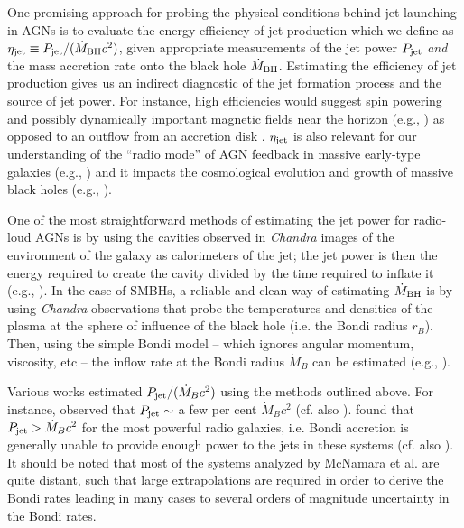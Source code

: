 \documentclass[useAMS,usenatbib]{mn2e}
\begin{document}
One promising approach for probing the physical conditions behind jet launching in AGNs is to evaluate the energy efficiency of jet production which we define as $\eta_{\rm jet} \equiv P_{\rm jet}/(\dot{M}_{\rm BH} c^2)$, given appropriate measurements of the jet power $P_{\rm jet}$ \emph{and} the mass accretion rate onto the black hole $\dot{M}_{\rm BH}$. Estimating the efficiency of jet production gives us an indirect diagnostic of the jet formation process and the source of jet power. For instance, high efficiencies would suggest spin powering and possibly dynamically important magnetic fields near the horizon (e.g., \citealt{Sasha11,Zamaninasab14}) as opposed to an outflow from an accretion disk \citep{Blandford82,Ghosh97,Livio99}. $\eta_{\rm jet}$ is also relevant for our understanding of the ``radio mode'' of AGN feedback in massive early-type galaxies (e.g., \citealt{Allen06,McNamara07,Fabian12}) and it impacts the cosmological evolution and growth of massive black holes (e.g., \citealt{Fanidakis11,Volonteri12}).

One of the most straightforward methods of estimating the jet power for radio-loud AGNs is by using the cavities observed in \emph{Chandra} images of the environment of the galaxy as calorimeters of the jet; the jet power is then the energy required to create the cavity divided by the time required to inflate it (e.g., \citealt{Dunn04,Birzan04,Dunn05,Allen06,McNamara12}). In the case of SMBHs, a reliable and clean way of estimating $\dot{M}_{\rm BH}$ is by using \emph{Chandra} observations that probe the temperatures and densities of the plasma at the sphere of influence of the black hole (i.e. the Bondi radius $r_B$). Then, using the simple Bondi model \citep{Bondi52} -- which ignores angular momentum, viscosity, etc -- the inflow rate at the Bondi radius $\dot{M}_B$ can be estimated (e.g., \citealt{Di-Matteo03}). 

Various works estimated $P_{\rm jet}/(\dot{M}_B c^2)$ using the methods outlined above. For instance, \cite{Allen06} observed that $P_{\rm jet} \sim$ a few per cent $\dot{M}_B c^2$ (cf. also \citealt{Merloni07,Balmaverde08,Vattakunnel10,Russell13}). \cite{McNamara11} found that $P_{\rm jet} > \dot{M}_B c^2$ for the most powerful radio galaxies, i.e. Bondi accretion is generally unable to provide enough power to the jets in these systems (cf. also \citealt{Rafferty06}). It should be noted that most of the systems analyzed by McNamara et al. are quite distant, such that large extrapolations are required in order to derive the Bondi rates leading in many cases to several orders of magnitude uncertainty in the Bondi rates.
\end{document}

